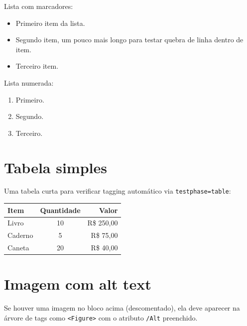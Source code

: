 \documentclass[11pt,a5paper,twoside,openright]{scrbook}
\begin{document}
Lista com marcadores:
\begin{itemize}
    \item Primeiro item da lista.
    \item Segundo item, um pouco mais longo para testar quebra
          de linha dentro de item.
    \item Terceiro item.
\end{itemize}

Lista numerada:
\begin{enumerate}
    \item Primeiro.
    \item Segundo.
    \item Terceiro.
\end{enumerate}

\section{Tabela simples}

Uma tabela curta para verificar tagging automático via
\texttt{testphase=table}:

\begin{center}
\begin{tabular}{lcr}
    \toprule
    \textbf{Item} & \textbf{Quantidade} & \textbf{Valor} \\
    \midrule
    Livro         & 10                  & R\$ 250,00     \\
    Caderno       &  5                  & R\$  75,00     \\
    Caneta        & 20                  & R\$  40,00     \\
    \bottomrule
\end{tabular}
\end{center}

\section{Imagem com alt text}

%

Se houver uma imagem no bloco acima (descomentado), ela deve
aparecer na árvore de tags como \texttt{<Figure>} com o
atributo \texttt{/Alt} preenchido.
\end{document}
